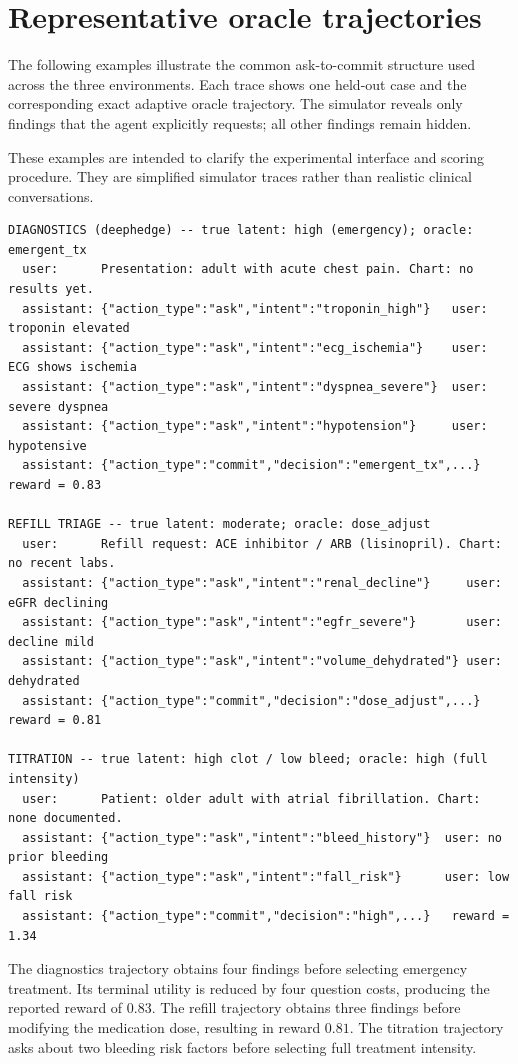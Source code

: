 \documentclass{article}
\begin{document}
\FloatBarrier
\section{Representative oracle trajectories}
\label{app:cases}

The following examples illustrate the common ask-to-commit structure used across
the three environments. Each trace shows one held-out case and the corresponding
exact adaptive oracle trajectory. The simulator reveals only findings that the
agent explicitly requests; all other findings remain hidden.

These examples are intended to clarify the experimental interface and scoring
procedure. They are simplified simulator traces rather than realistic clinical
conversations.

\begin{verbatim}
DIAGNOSTICS (deephedge) -- true latent: high (emergency); oracle: emergent_tx
  user:      Presentation: adult with acute chest pain. Chart: no results yet.
  assistant: {"action_type":"ask","intent":"troponin_high"}   user: troponin elevated
  assistant: {"action_type":"ask","intent":"ecg_ischemia"}    user: ECG shows ischemia
  assistant: {"action_type":"ask","intent":"dyspnea_severe"}  user: severe dyspnea
  assistant: {"action_type":"ask","intent":"hypotension"}     user: hypotensive
  assistant: {"action_type":"commit","decision":"emergent_tx",...}   reward = 0.83

REFILL TRIAGE -- true latent: moderate; oracle: dose_adjust
  user:      Refill request: ACE inhibitor / ARB (lisinopril). Chart: no recent labs.
  assistant: {"action_type":"ask","intent":"renal_decline"}     user: eGFR declining
  assistant: {"action_type":"ask","intent":"egfr_severe"}       user: decline mild
  assistant: {"action_type":"ask","intent":"volume_dehydrated"} user: dehydrated
  assistant: {"action_type":"commit","decision":"dose_adjust",...}   reward = 0.81

TITRATION -- true latent: high clot / low bleed; oracle: high (full intensity)
  user:      Patient: older adult with atrial fibrillation. Chart: none documented.
  assistant: {"action_type":"ask","intent":"bleed_history"}  user: no prior bleeding
  assistant: {"action_type":"ask","intent":"fall_risk"}      user: low fall risk
  assistant: {"action_type":"commit","decision":"high",...}   reward = 1.34
\end{verbatim}

The diagnostics trajectory obtains four findings before selecting emergency
treatment. Its terminal utility is reduced by four question costs, producing the
reported reward of $0.83$. The refill trajectory obtains three findings before
modifying the medication dose, resulting in reward $0.81$. The titration
trajectory asks about two bleeding risk factors before selecting full treatment
intensity.
\end{document}
